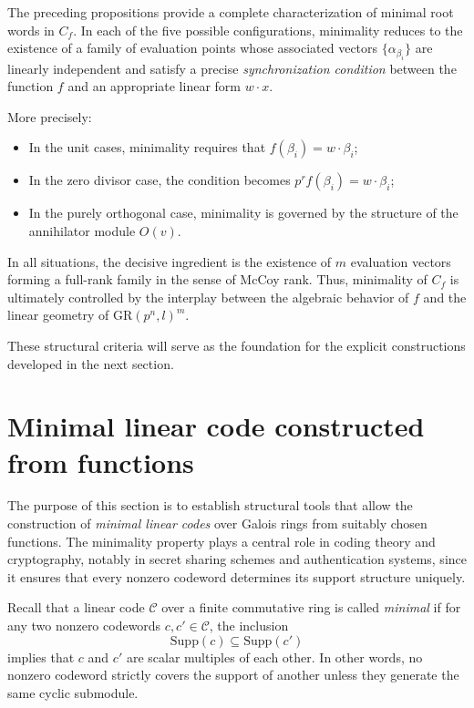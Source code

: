 \documentclass[10pt]{article}
\theoremstyle{definition}
\begin{document}
The preceding propositions provide a complete characterization
of minimal root words in $C_f$.
In each of the five possible configurations,
minimality reduces to the existence of a family of evaluation points
whose associated vectors $\{\alpha_{\beta_i}\}$
are linearly independent and satisfy a precise
\emph{synchronization condition} between the function $f$
and an appropriate linear form $w\cdot x$.

More precisely:

\begin{itemize}
\item In the unit cases, minimality requires that
      $f(\beta_i)=w\cdot \beta_i$;

\item In the zero divisor case, the condition becomes
      $p^r f(\beta_i)=w\cdot \beta_i$;

\item In the purely orthogonal case, minimality is governed
      by the structure of the annihilator module $O(v)$.
\end{itemize}

In all situations, the decisive ingredient is the existence
of $m$ evaluation vectors forming a full-rank family
in the sense of McCoy rank.
Thus, minimality of $C_f$ is ultimately controlled
by the interplay between the algebraic behavior of $f$
and the linear geometry of $\mathrm{GR}(p^n,l)^m$.

These structural criteria will serve as the foundation
for the explicit constructions developed in the next section.

\section{Minimal linear code constructed from functions}\label{section 5}


The purpose of this section is to establish structural tools that allow the construction of
\emph{minimal linear codes} over Galois rings from suitably chosen functions.
The minimality property plays a central role in coding theory and cryptography,
notably in secret sharing schemes and authentication systems, since it ensures
that every nonzero codeword determines its support structure uniquely.

Recall that a linear code $\mathcal{C}$ over a finite commutative ring is called
\emph{minimal} if for any two nonzero codewords $c,c'\in\mathcal{C}$,
the inclusion
\[
\mathrm{Supp}(c)\subseteq \mathrm{Supp}(c')
\]
implies that $c$ and $c'$ are scalar multiples of each other.
In other words, no nonzero codeword strictly covers the support of another
unless they generate the same cyclic submodule.
\end{document}
